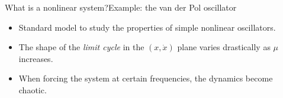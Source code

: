 \documentclass[usenames,dvipsnames,svgnames,10pt,aspectratio=169]{beamer}
\begin{document}
\begin{frame}[t, c]{What is a nonlinear system?}{Example: the van der Pol oscillator}
	\begin{minipage}{.58\textwidth}
		\begin{itemize}
			\item Standard model to study the properties of simple nonlinear oscillators.

			\bigskip

			\item The shape of the \emph{limit cycle} in the \((x, \dot{x})\) plane varies drastically as \(\mu\) increases.

			\bigskip

			\item When forcing the system at certain frequencies, the dynamics become chaotic.
		\end{itemize}
	\end{minipage}%
	\hfill
	\begin{minipage}{.38\textwidth}
		\centering

\end{minipage}
\end{frame}
\end{document}
